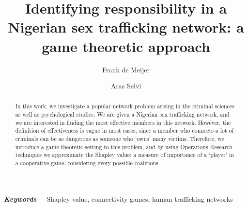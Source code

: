 \documentclass[10p]{article}
\makeatletter
\newcommand{\reqnomode}{\tagsleft@false\let\veqno\@@eqno}
\providecommand{\keywords}[1]{\textbf{\textit{Keywords---}} #1} %
\theoremstyle{definition}
\theoremstyle{definition}
\makeatother
\begin{document}
\setlength{\droptitle}{-4em}   %

\title{Identifying responsibility in a Nigerian sex trafficking network: a game theoretic approach}
\author[1]{Frank de Meijer}
\author[2]{Aras Selvi}

\date{}

\maketitle

\begin{abstract} \noindent
In this work, we investigate a popular network problem arising in the criminal sciences as well as psychological studies. We are given a Nigerian sex trafficking network, and we are interested in finding the most effective members in this network. However, the definition of effectiveness is vague in most cases, since a member who connects a lot of criminals can be as dangerous as someone who `owns' many victims. Therefore, we introduce a game theoretic setting to this problem, and by using Operations Research techniques we approximate the Shapley value: a measure of importance of a `player' in a cooperative game, considering every possible coalitions. 
\end{abstract}
\keywords{Shapley value, connectivity games, human trafficking networks}

\reqnomode
\end{document}
